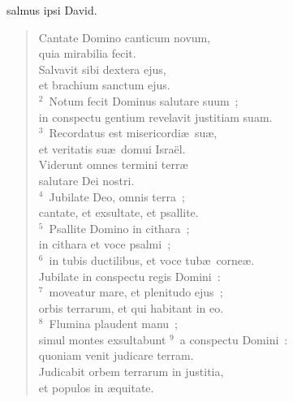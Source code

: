 \bchapter
{}salmus ipsi David. \begin{flushleft}\begin{verse}\vspace{6pt}Cantate Domino canticum novum,\\ quia mirabilia fecit.\\ Salvavit sibi dextera ejus,\\ et brachium sanctum ejus.\\
${}^{2}$~Notum fecit Dominus salutare suum~;\\ in conspectu gentium revelavit justitiam suam.\\
${}^{3}$~Recordatus est misericordi\ae\ su\ae ,\\ et veritatis su\ae\ domui Isra\"el.\\ Viderunt omnes termini terr\ae \\ salutare Dei nostri.\\
${}^{4}$~Jubilate Deo, omnis terra~;\\ cantate, et exsultate, et psallite.\\
${}^{5}$~Psallite Domino in cithara~;\\ in cithara et voce psalmi~;\\
${}^{6}$~in tubis ductilibus, et voce tub\ae\ corne\ae .\\ Jubilate in conspectu regis Domini~:\\
${}^{7}$~moveatur mare, et plenitudo ejus~;\\ orbis terrarum, et qui habitant in eo.\\
${}^{8}$~Flumina plaudent manu~;\\ simul montes exsultabunt
${}^{9}$~a conspectu Domini~:\\ quoniam venit judicare terram.\\ Judicabit orbem terrarum in justitia,\\ et populos in \ae quitate.\end{verse}\end{flushleft}




